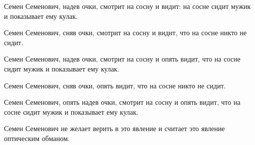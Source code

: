 Семен Семенович, надев очки, смотрит на
сосну и видит: на сосне сидит мужик и показывает 
ему кулак.
    
Семен Семенович, сняв очки, смотрит на
сосну и видит, что на сосне никто не сидит.
    
Семен Семенович, надев очки, смотрит на
сосну и опять видит, что на сосне сидит мужик 
и показывает ему кулак.
    
Семен Семенович, сняв очки, опять видит,
что на сосне никто не сидит.
    
Семен Семенович, опять надев очки, смотрит 
на сосну и опять видит, что на сосне сидит 
мужик и показывает ему кулак.
    
Семен Семенович не желает верить в это
явление и считает это явление оптическим 
обманом.